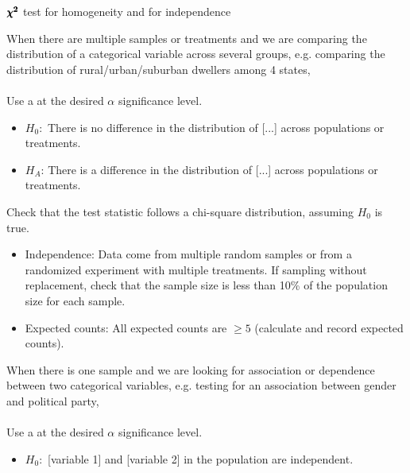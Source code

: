 \begin{onebox}{$\pmb{\MakeLowercase{\chi^2}}$ test for homogeneity and for independence}

When there are multiple samples or treatments and we are comparing the distribution
of a categorical variable across several groups, e.g. comparing the distribution of
rural/urban/suburban dwellers among 4 states, 
\\
\\
 Use a  at the desired $\alpha$ significance level.
\vspace{-1mm}
\begin{itemize}
\setlength{\itemsep}{0mm}
\item[]  $H_0$: \,There is no difference in the distribution of [...] across populations or treatments.  
\item[] $H_A$: There is a difference in the distribution of [...] across populations or treatments.  
\end{itemize}
 Check that the test statistic follows a chi-square distribution, assuming $H_0$ is true.\vspace{-1mm}
{\setlength{\leftmargini}{13mm}
\begin{itemize}
\setlength{\itemsep}{0mm}
\item[1.] Independence:  Data come from multiple random samples or from a randomized 
experiment with multiple treatments.  If sampling without replacement, check that the
sample size is less than 10\% of the population size for each sample.
\item[2.] Expected counts:  All expected counts are $\ge 5$ (calculate and record expected counts).
\end{itemize}
}
\vspace{2mm}
When there is one sample and we are looking for association or dependence between two categorical variables, e.g. testing for an association between gender and political party,\\
\\
 Use a  at the desired $\alpha$ significance level.
\vspace{-1mm}
\begin{itemize}
\setlength{\itemsep}{0mm}
 \item[]  $H_0$: \,[variable 1] and [variable 2]  in the population are independent.

\end{itemize}
\end{onebox}
